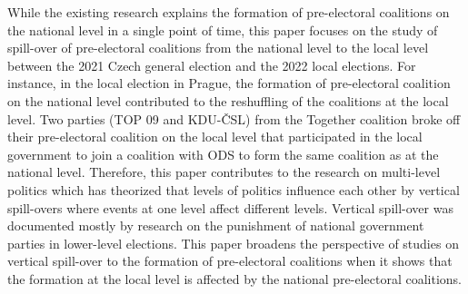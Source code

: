 \documentclass[fignum,12pt,titlepage]{article}
\begin{document}

While the existing research explains the formation of pre-electoral coalitions on the national level in a single point of time, this paper focuses on the study of spill-over of pre-electoral coalitions from the national level to the local level between the 2021 Czech general election and the 2022 local elections. 
For instance, in the local election in Prague, the formation of pre-electoral coalition on the national level contributed to the reshuffling of the coalitions at the local level. Two parties (TOP 09 and KDU-ČSL) from the Together coalition broke off their pre-electoral coalition on the local level that participated in the local government to join a coalition with ODS to form the same coalition as at the national level. 
Therefore, this paper contributes to the research on multi-level politics which has theorized that levels of politics influence each other by vertical spill-overs where events at one level affect different levels. Vertical spill-over was documented mostly by research on the punishment of national government parties in lower-level elections. This paper broadens the perspective of studies on vertical spill-over to the formation of pre-electoral coalitions when it shows that the formation at the local level is affected by the national pre-electoral coalitions. 

\end{document}

